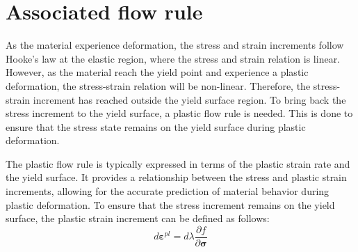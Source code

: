 \documentclass[12pt]{article}
\begin{document}
%


\section{Associated flow rule}
\hspace{2em}As the material experience deformation, the stress and strain increments
follow Hooke's law at the elastic region, 
where the stress and strain relation is linear. 
However, as the material reach the yield point and experience a plastic deformation, the stress-strain
relation will be non-linear. Therefore, the stress-strain increment has reached outside the yield surface
region. To bring back the stress increment to the yield surface, a plastic flow rule is needed. This is done
to ensure that the stress state remains on the yield surface during plastic deformation. 

\hspace{2em}The plastic flow rule
is typically expressed in terms of the plastic strain rate and the yield surface. It provides a relationship
between the stress and plastic strain increments, allowing for the accurate prediction of
material behavior during plastic deformation. To ensure that the stress increment remains on the yield surface,
the plastic strain increment can be defined as follows:
\begin{equation}
    d \boldsymbol{\varepsilon}^{pl} = d \lambda \frac{\partial f}{\partial \boldsymbol{\sigma}}
\end{equation}
\end{document}
